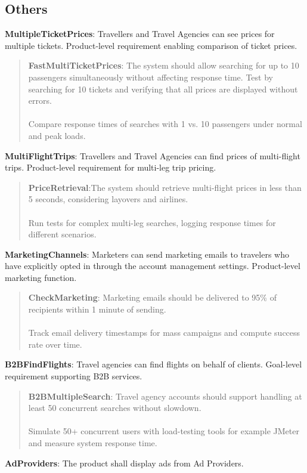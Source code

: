 \subsection{Others}
\textbf{MultipleTicketPrices}: Travellers and Travel Agencies can see prices for multiple tickets. Product-level requirement enabling comparison of ticket prices.
\begin{quote}
    \textbf{FastMultiTicketPrices}: The system should allow searching for up to 10 passengers simultaneously without affecting response time. Test by searching for 10 tickets and verifying that all prices are displayed without errors.\\ \\
     Compare response times of searches with 1 vs. 10 passengers under normal and peak loads.
\end{quote}
\textbf{MultiFlightTrips}: Travellers and Travel Agencies can find prices of multi-flight trips. Product-level requirement for multi-leg trip pricing.
    \begin{quote}
        \textbf{PriceRetrieval}:The system should retrieve multi-flight prices in less than 5 seconds, considering layovers and airlines. \\ \\ 
        Run tests for complex multi-leg searches, logging response times for different scenarios.
    \end{quote}
\textbf{MarketingChannels}: Marketers can send marketing emails to travelers who have explicitly opted in through the account management settings. Product-level marketing function.
\begin{quote}
    \textbf{CheckMarketing}: Marketing emails should be delivered to 95\% of recipients within 1 minute of sending. \\ \\
    Track email delivery timestamps for mass campaigns and compute success rate over time.
\end{quote}
\textbf{B2BFindFlights}: Travel agencies can find flights on behalf of clients. Goal-level requirement supporting B2B services.
\begin{quote}
    \textbf{B2BMultipleSearch}: Travel agency accounts should support handling at least 50 concurrent searches without slowdown. \\ \\ 
Simulate 50+ concurrent users with load-testing tools for example JMeter and measure system response time.
\end{quote}
\textbf{AdProviders}: The product shall display ads from Ad Providers.

